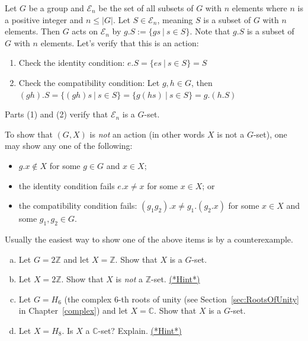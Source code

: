 \begin{example}\label{example:actions:Action6}
Let $G$ be a group and $\mathcal{E}_n$ be the set of all subsets of $G$ with $n$ elements where $n$ is a positive integer and $n\leq |G|$. Let $S \in \mathcal{E}_n$, meaning $S$ is a subset of $G$ with $n$ elements. Then $G$ acts on $\mathcal{E}_n$ by $g.S:=\{gs~|~s \in S\}$. Note that $g.S$ is a subset of $G$ with $n$ elements. Let's verify that this is an action:
\begin{enumerate}[(1)]
\item Check the identity condition: $e.S=\{es~|~s \in S\}=S$
\item Check the compatibility condition: Let $g,h \in G$, then $(gh).S=\{(gh)s~|~s \in S\}=\{g(hs)~|~s \in S\}=g.(h.S)$
\end{enumerate}
Parts (1) and (2) verify that $\mathcal{E}_n$ is a $G$-set.
\end{example}

To show that $(G,X)$ is \emph{not} an action (in other words $X$ is not a $G$-set), one may show any one of the following:
\begin{itemize}
\item $g.x \notin X$ for some $g \in G$ and $x \in X$;
\item the identity condition fails $e.x \neq x$ for some $x\in X$; or
\item the compatibility condition fails: $(g_1g_2).x \neq g_1.(g_2.x)$ for some $x\in X$ and some $g_1, g_2 \in G$.
\end{itemize}
Usually the easiest way to show one of the above items is by a counterexample.

\begin{exercise}\label{exercise:actions:Action7}
\begin{enumerate}[(a)]
\item 
Let $G = 2\mathbb{Z}$ and let $X =\mathbb{Z}$. Show that $X$ is a $G$-set.
\item Let $X = 2\mathbb{Z}$. Show that $X$ is \emph{not} a $\mathbb{Z}$-set.
\hyperref[sec:actions:hints]{(*Hint*)}
\item Let $G = H_6$ (the complex $6$-th roots of unity (see Section~\ref{sec:RootsOfUnity} in Chapter~\ref{complex}) and let $X =\mathbb{C}$. Show that $X$ is a $G$-set.
\item Let $X = H_8$.  Is $X$ a $\mathbb{C}$-set? Explain.
\hyperref[sec:actions:hints]{(*Hint*)}
\end{enumerate}
\end{exercise}

